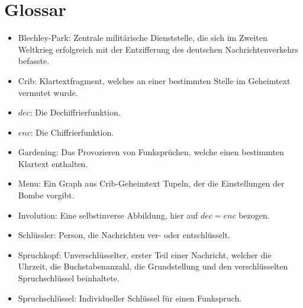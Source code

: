 \documentclass[ngerman, a4paper, footsepline, headsepline]{scrreport}
\newcommand{\fmbox}[1]{
	\begin{center}
		\fcolorbox{black}{yellow}
		{\parbox{0.88\textwidth}
			{\textcolor{black}
				{#1}
			}
		}
	\end{center}
}
\begin{document}
%	
%	
%	
%	
%	
%	
%	
%	
%	
%	
%	

	\chapter{Glossar}
	\begin{itemize}
		\item Blechley-Park: Zentrale militärische Dienststelle, die sich im Zweiten Weltkrieg erfolgreich mit der Entzifferung des deutschen Nachrichtenverkehrs befasste.
		\item Crib: Klartextfragment, welches an einer bestimmten Stelle im Geheimtext vermutet wurde.
		\item $dec$: Die Dechiffrierfunktion.
		\item $enc$: Die Chiffrierfunktion.
		\item Gardening: Das Provozieren von Funksprüchen, welche einen bestimmten Klartext enthalten.
		\item Menu: Ein Graph aus Crib-Geheimtext Tupeln, der die Einstellungen der Bombe vorgibt.
		\item Involution: Eine selbstinverse Abbildung, hier auf $dec = enc$ bezogen.
		\item Schlüssler: Person, die Nachrichten ver- oder entschlüsselt.
		\item Spruchkopf: Unverschlüsselter, erster Teil einer Nachricht, welcher die Uhrzeit, die Buchstabenanzahl, die Grundstellung und den verschlüsselten Spruchschlüssel beinhaltete.
		\item Spruchschlüssel:  Individueller Schlüssel für einen Funkspruch.
	\end{itemize}
	
\end{document}
